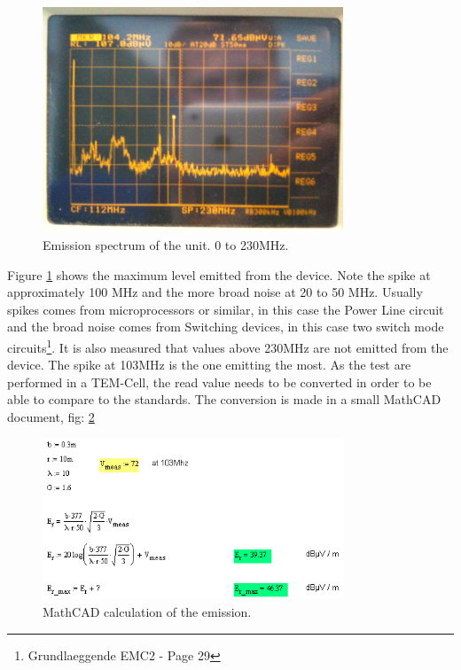 \begin{figure}[H]
	\begin{centering}
		 \includegraphics[width=0.8\textwidth]{images/measure_on.jpg}
		\caption{Emission spectrum of the unit. 0 to 230MHz.}
		\label{fig:spectrum_on}
	\end{centering}
\end{figure}
Figure \ref{fig:spectrum_on} shows the maximum level emitted from the device. Note the spike at approximately 100 MHz and the more broad noise at 20 to 50 MHz. Usually spikes comes from microprocessors or similar, in this case the Power Line circuit and the broad noise comes from Switching devices, in this case two switch mode circuits\footnote{Grundlaeggende EMC2 - Page 29}. It is also measured that values above 230MHz are not emitted from the device.
\p The spike at 103MHz is the one emitting the most. As the test are performed in a TEM-Cell, the read value needs to be converted in order to be able to compare to the standards. The conversion is made in a small MathCAD document, fig: \ref{fig:mathcad}
\begin{figure}[H]
	\begin{centering}
		 \includegraphics[width=0.8\textwidth]{images/mathcad_emission}
		\caption{MathCAD calculation of the emission.}
	\label{fig:mathcad}
	\end{centering}
\end{figure}
